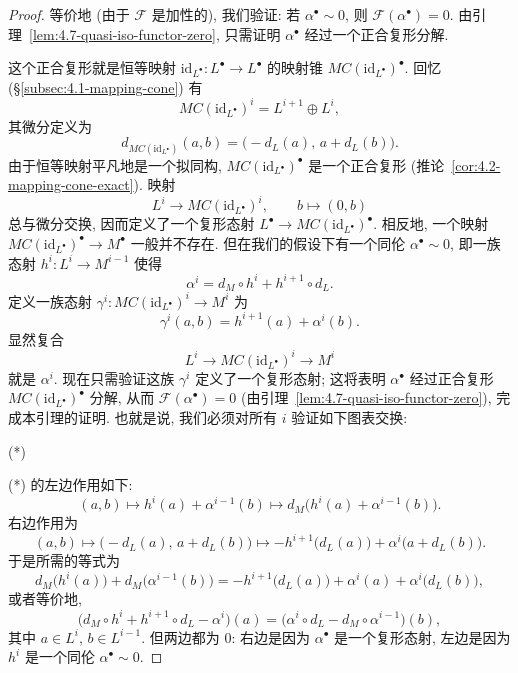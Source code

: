\begin{proof}
等价地 (由于 $\mathcal{F}$ 是加性的), 我们验证: 若 $\alpha^\bullet\sim 0$, 则 $\mathcal{F}(\alpha^\bullet)=0$. 由引理~\ref{lem:4.7-quasi-iso-functor-zero}, 只需证明 $\alpha^\bullet$ 经过一个正合复形分解.

这个正合复形就是恒等映射 $\mathrm{id}_{L^\bullet}:L^\bullet\to L^\bullet$ 的映射锥 $MC(\mathrm{id}_{L^\bullet})^\bullet$. 回忆 (\S\ref{subsec:4.1-mapping-cone}) 有
\[
MC(\mathrm{id}_{L^\bullet})^i=L^{i+1}\oplus L^i,
\]
其微分定义为
\[
d_{MC(\mathrm{id}_{L^\bullet})}(a,b)=\bigl(-d_L(a),\,a+d_L(b)\bigr).
\]
由于恒等映射平凡地是一个拟同构, $MC(\mathrm{id}_{L^\bullet})^\bullet$ 是一个正合复形 (推论~\ref{cor:4.2-mapping-cone-exact}). 映射
\[
L^i\longrightarrow MC(\mathrm{id}_{L^\bullet})^i,\qquad b\longmapsto (0,b)
\]
总与微分交换, 因而定义了一个复形态射 $L^\bullet\to MC(\mathrm{id}_{L^\bullet})^\bullet$. 相反地, 一个映射 $MC(\mathrm{id}_{L^\bullet})^\bullet\to M^\bullet$ 一般并不存在. 但在我们的假设下有一个同伦 $\alpha^\bullet\sim 0$, 即一族态射 $h^i:L^i\to M^{i-1}$ 使得
\[
\alpha^i=d_M\circ h^i+h^{i+1}\circ d_L.
\]
定义一族态射 $\gamma^i:MC(\mathrm{id}_{L^\bullet})^i\to M^i$ 为
\[
\gamma^i(a,b)=h^{i+1}(a)+\alpha^i(b).
\]
显然复合
\[
L^i\longrightarrow MC(\mathrm{id}_{L^\bullet})^i\longrightarrow M^{i}
\]
就是 $\alpha^{i}$. 现在只需验证这族 $\gamma^{i}$ 定义了一个复形态射; 这将表明 $\alpha^\bullet$ 经过正合复形 $MC(\mathrm{id}_{L^\bullet})^\bullet$ 分解, 从而 $\mathcal{F}(\alpha^\bullet)=0$ (由引理~\ref{lem:4.7-quasi-iso-functor-zero}), 完成本引理的证明. 也就是说, 我们必须对所有 $i$ 验证如下图表交换:
\begin{center}
\qquad(*)
\end{center}
(*) 的左边作用如下:
\[
(a,b)\longmapsto h^{i}(a)+\alpha^{i-1}(b)\longmapsto d_M\bigl(h^{i}(a)+\alpha^{i-1}(b)\bigr).
\]
右边作用为
\[
(a,b)\longmapsto \bigl(-d_L(a),\,a+d_L(b)\bigr)\longmapsto -h^{i+1}\bigl(d_L(a)\bigr)+\alpha^{i}\bigl(a+d_L(b)\bigr).
\]
于是所需的等式为
\[
d_M\bigl(h^{i}(a)\bigr)+d_M\bigl(\alpha^{i-1}(b)\bigr)=-h^{i+1}\bigl(d_L(a)\bigr)+\alpha^{i}(a)+\alpha^{i}\bigl(d_L(b)\bigr),
\]
或者等价地,
\[
\bigl(d_M\circ h^{i}+h^{i+1}\circ d_L-\alpha^{i}\bigr)(a)=\bigl(\alpha^{i}\circ d_L-d_M\circ\alpha^{i-1}\bigr)(b),
\]
其中 $a\in L^{i}$, $b\in L^{i-1}$. 但两边都为 $0$: 右边是因为 $\alpha^\bullet$ 是一个复形态射, 左边是因为 $h^{i}$ 是一个同伦 $\alpha^\bullet\sim 0$.
\end{proof}

